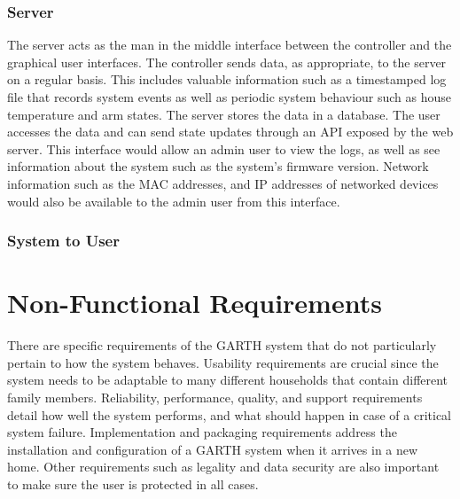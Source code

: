 \documentclass{report}
\begin{document}
\subsection{Server}
The server acts as the man in the middle interface between the controller and
the graphical user interfaces. The controller sends data, as appropriate, to
the server on a regular basis. This includes valuable information such as
a timestamped log file that records system events as well as periodic system
behaviour such as house temperature and arm states. The server stores the data in a 
database. The user accesses the data and can send state updates through an API 
exposed by the web server. This interface would allow an admin user to view the
logs, as well as see information about the system such as the system's firmware 
version. Network information such as the MAC addresses, and IP addresses of 
networked devices would also be available to the admin user from this interface.

\subsection{System to User}


\begin{figure}[hp]
    \centering
        \caption{}
        \setlength{\unitlength}{2.0em}
        
    \label{fig:system_to_user_chart}
\end{figure}
\chapter{Non-Functional Requirements}
There are specific requirements of the GARTH system that do not particularly
pertain to how the system behaves. Usability requirements are crucial since the
system needs to be adaptable to many different households that contain different
family members. Reliability, performance, quality, and support requirements detail 
how well the system performs, and what should happen in case of a critical system 
failure. Implementation and packaging requirements address the installation
and configuration of a GARTH system when it arrives in a new home. Other 
requirements such as legality and data security are also important to make sure
the user is protected in all cases.
\end{document}
